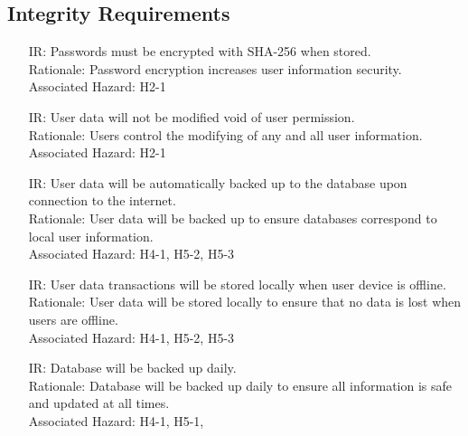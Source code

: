 \documentclass{article}
\newcounter{IRnum}
\begin{document}
	\subsection{Integrity Requirements}
	\noindent 
	\begin{itemize}
		\item[IR\refstepcounter{IRnum}\theIRnum:]
		Passwords must be encrypted with SHA-256 when stored.
		\\Rationale: Password encryption increases user information security.
		\\Associated Hazard: H2-1
		\item[IR\refstepcounter{IRnum}\theIRnum:]
		User data will not be modified void of user permission.
		\\Rationale: Users control the modifying of any and all user information.
		\\Associated Hazard: H2-1
		\item[IR\refstepcounter{IRnum}\theIRnum:]
		User data will be automatically backed up to the database upon connection to the internet.
		\\Rationale: User data will be backed up to ensure databases correspond to local user information.
		\\Associated Hazard: H4-1, H5-2, H5-3
		\item[IR\refstepcounter{IRnum}\theIRnum:]
		User data transactions will be stored locally when user device is offline.
		\\Rationale: User data will be stored locally to ensure that no data is lost when users are offline.
		\\Associated Hazard: H4-1, H5-2, H5-3
		\item[IR\refstepcounter{IRnum}\theIRnum:]
		Database will be backed up daily.
		\\Rationale: Database will be backed up daily to ensure all information is safe and updated at all times.
		\\Associated Hazard: H4-1, H5-1, 
	\end{itemize}
\end{document}
